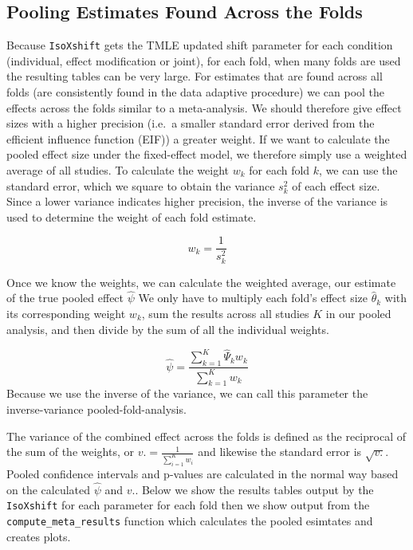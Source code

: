 \documentclass[
]{article}
\begin{document}
\hypertarget{pooling-estimates-found-across-the-folds}{%
\subsection{Pooling Estimates Found Across the
Folds}\label{pooling-estimates-found-across-the-folds}}

Because \texttt{IsoXshift} gets the TMLE updated shift parameter for
each condition (individual, effect modification or joint), for each
fold, when many folds are used the resulting tables can be very large.
For estimates that are found across all folds (are consistently found in
the data adaptive procedure) we can pool the effects across the folds
similar to a meta-analysis. We should therefore give effect sizes with a
higher precision (i.e.~a smaller standard error derived from the
efficient influence function (EIF)) a greater weight. If we want to
calculate the pooled effect size under the fixed-effect model, we
therefore simply use a weighted average of all studies. To calculate the
weight \(w_k\) for each fold \(k\), we can use the standard error, which
we square to obtain the variance \(s^2_k\) of each effect size. Since a
lower variance indicates higher precision, the inverse of the variance
is used to determine the weight of each fold estimate.

\[w_k = \frac{1}{s^2_k}\]

Once we know the weights, we can calculate the weighted average, our
estimate of the true pooled effect \(\hat{\psi}\) We only have to
multiply each fold's effect size \(\hat{\theta}_k\) with its
corresponding weight \(w_k\), sum the results across all studies \(K\)
in our pooled analysis, and then divide by the sum of all the individual
weights.

\[\hat{\psi} = \frac{\sum_{k = 1}^K \hat{\Psi}_k w_k}{\sum_{k = 1}^K w_k}\]
Because we use the inverse of the variance, we can call this parameter
the inverse-variance pooled-fold-analysis.

The variance of the combined effect across the folds is defined as the
reciprocal of the sum of the weights, or
\(v. = \frac{1}{\sum_{i=1}^K w_i}\) and likewise the standard error is
\(\sqrt{v.}\). Pooled confidence intervals and p-values are calculated
in the normal way based on the calculated \(\hat{\psi}\) and \(v.\).
Below we show the results tables output by the \texttt{IsoXshift} for
each parameter for each fold then we show output from the
\texttt{compute\_meta\_results} function which calculates the pooled
esimtates and creates plots.
\end{document}

